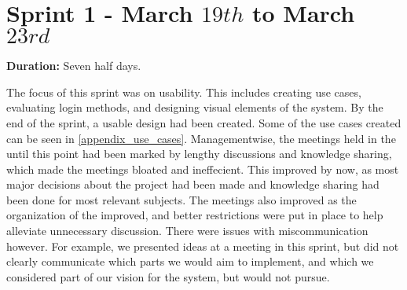 \section{Sprint 1 - March $19th$ to March $23rd$}

\textbf{Duration:} Seven half days. \newline

The focus of this sprint was on usability. 
This includes creating use cases, evaluating login methods, and designing visual elements of the system. 
By the end of the sprint, a usable design had been created. 
Some of the use cases created can be seen in \autoref{appendix_use_cases}. \newline
Managementwise, the meetings held in the \globalgroup{} until this point had been marked by lengthy discussions and knowledge sharing, which made the meetings bloated and ineffecient. 
This improved by now, as most major decisions about the project had been made and knowledge sharing had been done for most relevant subjects. 
The meetings also improved as the organization of the \globalgroup{} improved, and better restrictions were put in place to help alleviate unnecessary discussion. \newline
There were issues with miscommunication however. 
For example, we presented ideas at a meeting in this sprint, but did not clearly communicate which parts we would aim to implement, and which we considered part of our vision for the system, but would not pursue. 
